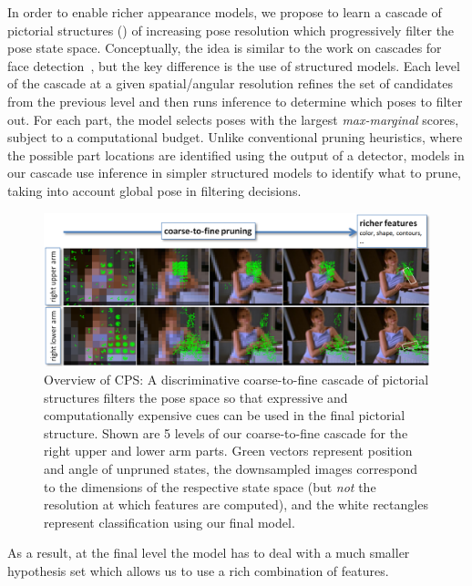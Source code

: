 In order to enable richer appearance models, we propose to learn a cascade of 
pictorial structures (\CPS) of increasing pose resolution which 
progressively filter the pose state space.  Conceptually, the idea is similar 
to the work on cascades for face detection~\cite{geman2001,viola02}, but the 
key difference is the use of structured models. Each level of the cascade at a 
given spatial/angular resolution refines the set of candidates from the 
previous level and then runs inference to determine which poses to filter out.  
For each part, the model selects poses with the largest {\em max-marginal}
scores, subject to a computational budget.  Unlike conventional pruning 
heuristics, where the possible part locations are identified using the output 
of a detector, models in our cascade use inference in simpler structured models 
to identify what to prune, taking into account global pose in filtering 
decisions.
\begin{figure}[t]
\begin{center}
\includegraphics[width=1.0\textwidth]{figs/cps-overview.png}
\end{center}
\caption[Overview of Cascaded Pictorial Structures 
(CPS)]{\label{fig:cps-overview} Overview of CPS:  A discriminative 
coarse-to-fine cascade of pictorial structures filters the pose space so that 
expressive and computationally expensive cues can be used in the final 
pictorial structure.  Shown are 5 levels of our coarse-to-fine cascade for the 
right upper and lower arm parts.  Green vectors represent position and angle of 
unpruned states, the downsampled images correspond to the dimensions of the 
respective state space (but {\em not } the resolution at which features are 
computed), and the white rectangles represent classification using our final 
model.}
\end{figure}
As a result, at the final level the \CPS{} model has to deal with a much 
smaller hypothesis set which allows us to use a rich combination of features.  

